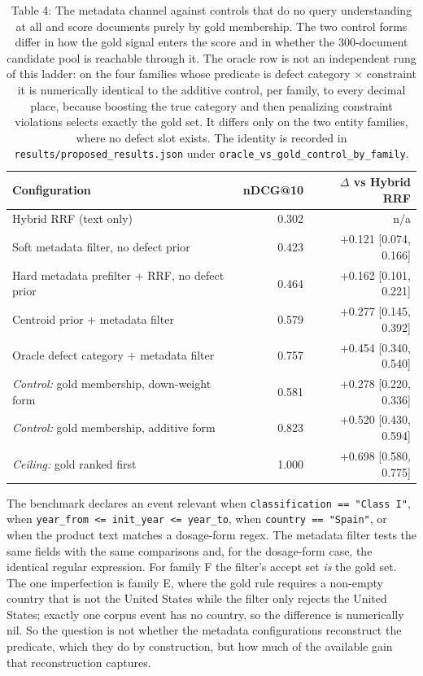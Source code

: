 \documentclass[runningheads]{llncs}
\begin{document}
\begin{table}[t]
\centering
\small
\caption{Table 4: The metadata channel against controls that do no query understanding at all and score documents purely by gold membership. The two control forms differ in how the gold signal enters the score and in whether the 300-document candidate pool is reachable through it. The oracle row is not an independent rung of this ladder: on the four families whose predicate is defect category $\times$ constraint it is numerically identical to the additive control, per family, to every decimal place, because boosting the true category and then penalizing constraint violations selects exactly the gold set. It differs only on the two entity families, where no defect slot exists. The identity is recorded in \texttt{results/proposed\_\allowbreak{}results.json} under \texttt{oracle\_vs\_\allowbreak{}gold\_\allowbreak{}control\_\allowbreak{}by\_family}.}
\begin{tabular}{lrr}
\toprule
Configuration & \textbf{nDCG@10} & $\Delta$ vs Hybrid RRF \\
\midrule
Hybrid RRF (text only) & 0.302 & n/a \\
Soft metadata filter, no defect prior & 0.423 & +0.121 [0.074, 0.166] \\
Hard metadata prefilter + RRF, no defect prior & 0.464 & +0.162 [0.101, 0.221] \\
Centroid prior + metadata filter & 0.579 & +0.277 [0.145, 0.392] \\
Oracle defect category + metadata filter & 0.757 & +0.454 [0.340, 0.540] \\
\textit{Control:} gold membership, down-weight form & 0.581 & +0.278 [0.220, 0.336] \\
\textit{Control:} gold membership, additive form & 0.823 & +0.520 [0.430, 0.594] \\
\textit{Ceiling:} gold ranked first & 1.000 & +0.698 [0.580, 0.775] \\
\bottomrule
\end{tabular}
\end{table}

The benchmark declares an event relevant when \texttt{classification == "Class I"}, when \texttt{year\_from <= init\_\allowbreak{}year <= year\_to}, when \texttt{country == "Spain"}, or when the product text matches a dosage-form regex. The metadata filter tests the same fields with the same comparisons and, for the dosage-form case, the identical regular expression. For family F the filter's accept set \textit{is} the gold set. The one imperfection is family E, where the gold rule requires a non-empty country that is not the United States while the filter only rejects the United States; exactly one corpus event has no country, so the difference is numerically nil. So the question is not whether the metadata configurations reconstruct the predicate, which they do by construction, but how much of the available gain that reconstruction captures.
\end{document}
